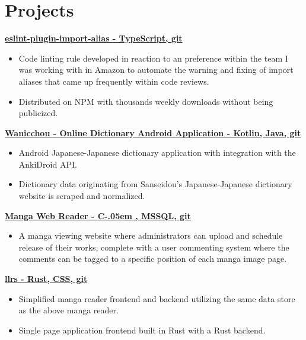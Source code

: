 \documentclass[letterpaper,11pt]{article}
\newcommand{\resumeItem}[2]{
    \vspace{-2pt}
    \item\small{
        \textbf{#1}{ #2 \vspace{-2pt}}
    }
}
\newcommand{\resumeItemListStart}{\begin{itemize}}
\newcommand{\resumeItemListEnd}{\end{itemize}}
\newcommand{\Csharp}{%
  {\settoheight{\dimen0}{C}C\kern-.05em \resizebox{!}{\dimen0}{\raisebox{\depth}{\#}}}}
\begin{document}
\section{\textbf{Projects}}
    \small{\textbf{
        \href {
            https://github.com/Limegrass/eslint-plugin-import-alias
        } {
            eslint-plugin-import-alias - TypeScript, git
        }}}
    \resumeItemListStart
        \resumeItem{}
            {
                Code linting rule developed in reaction to an preference within the team I was working with in Amazon
                to automate the warning and fixing of import aliases that came up frequently within code reviews.
            }
        \resumeItem{}
            {
                Distributed on NPM with thousands weekly downloads without being publicized.
            }
    \resumeItemListEnd
    \small{\textbf{
        \href {
            https://github.com/Limegrass/Wanicchou
        } {
            Wanicchou - Online Dictionary Android Application
            - Kotlin, Java, git
        }}}
    \resumeItemListStart
        \resumeItem{}
            {
                Android Japanese-Japanese dictionary application with integration with the AnkiDroid API.
            }
        \resumeItem{}
            {
                Dictionary data originating from Sanseidou's Japanese-Japanese
                dictionary website is scraped and normalized.
            }
    \resumeItemListEnd
    \small{\textbf{
        \href{
            https://waifusims.com/Manga/Hakoiri
        }{
            Manga Web Reader
            - \Csharp, MSSQL, git
        }}}
    \resumeItemListStart
        \resumeItem{}
            {
                A manga viewing website where administrators can upload and schedule
                release of their works, complete with a user commenting system
                where the comments can be tagged to a specific position of each manga
                image page.
            }
    \resumeItemListEnd
    \small{\textbf{
        \href {
            https://github.com/Limegrass/llrs
        } {
            llrs - Rust, CSS, git
        }}}
    \resumeItemListStart
        \resumeItem{}
            {
                Simplified manga reader frontend and backend utilizing the same data store as the above manga reader.
            }
        \resumeItem{}
            {
                Single page application frontend built in Rust with a Rust backend.
            }
    \resumeItemListEnd
\end{document}
